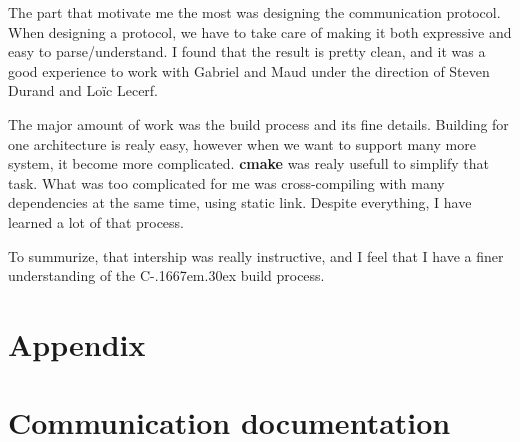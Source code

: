 \documentclass[a4paper,11pt]{custom}
\newcommand{\cmake}{\textbf{cmake}\xspace}
\newcommand{\cpp}{%
  C\kern-.1667em\raise.30ex\hbox{\smaller{++}\xspace}%
  \spacefactor1000%
}
\begin{document}
The part that motivate me the most was designing the communication protocol.
When designing a protocol, we have to take care of making it both expressive and
easy to parse/understand. I found that the result is pretty clean, and it was a
good experience to work with Gabriel and Maud under the direction of Steven
Durand and Loïc Lecerf.

The major amount of work was the build process and its fine details. Building
for one architecture is realy easy, however when we want to support many more
system, it become more complicated. \cmake{} was realy usefull to simplify that
task. What was too complicated for me was cross-compiling with many dependencies
at the same time, using static link. Despite everything, I have learned a lot of
that process.

To summurize, that intership was really instructive, and I feel that I have a
finer understanding of the \cpp{} build process.

\appendix

\chapter*{Appendix}

\chapter{Communication documentation}
\label{sec:documentation}

\end{document}
